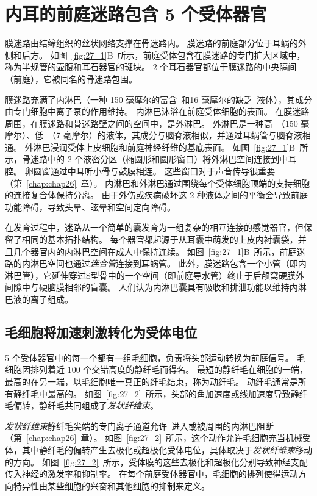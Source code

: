 \section{内耳的前庭迷路包含 5 个受体器官}

膜迷路由结缔组织的丝状网络支撑在骨迷路内。
膜迷路的前庭部分位于耳蜗的外侧和后方。
如图~\ref{fig:27_1}B~所示，前庭受体包含在膜迷路的专门扩大区域中，称为半规管的壶腹和耳石器官的斑块。
2 个耳石器官都位于膜迷路的中央隔间（前庭），它被同名的骨迷路包围。


膜迷路充满了内淋巴（一种 150 毫摩尔的富含~和16 毫摩尔的缺乏~液体），其成分由专门细胞中离子泵的作用维持。
内淋巴沐浴在前庭受体细胞的表面。
在膜迷路周围，在膜迷路和骨迷路壁之间的空间中，是外淋巴。
外淋巴是一种高~（150 毫摩尔）、低~（7 毫摩尔）的液体，其成分与脑脊液相似，并通过耳蜗管与脑脊液相通。
外淋巴浸润受体上皮细胞和前庭神经纤维的基底表面。
如图~\ref{fig:27_1}B~所示，骨迷路中的 2 个液密分区（椭圆形和圆形窗口）将外淋巴空间连接到中耳腔。
卵圆窗通过中耳听小骨与鼓膜相连。
这些窗口对于声音传导很重要（第~\ref{chap:chap26}~章）。
内淋巴和外淋巴通过围绕每个受体细胞顶端的支持细胞的连接复合体保持分离。
由于外伤或疾病破坏这 2 种液体之间的平衡会导致前庭功能障碍，导致头晕、眩晕和空间定向障碍。


在发育过程中，迷路从一个简单的囊发育为一组复杂的相互连接的感觉器官，但保留了相同的基本拓扑结构。
每个器官都起源于从耳囊中萌发的上皮内衬囊袋，并且几个器官内的内淋巴空间在成人中保持连续。
如图~\ref{fig:27_1}B~所示，前庭迷路的内淋巴空间也通过\textit{连合管}连接到耳蜗管。
此外，膜迷路包含一个小管（即内淋巴管），它延伸穿过S型骨中的一个空间（即前庭导水管）终止于后颅窝硬膜外间隙中与硬脑膜相邻的盲囊。
人们认为内淋巴囊具有吸收和排泄功能以维持内淋巴液的离子组成。


\subsection{毛细胞将加速刺激转化为受体电位}

5 个受体器官中的每一个都有一组毛细胞，负责将头部运动转换为前庭信号。
毛细胞因排列着近 100 个交错高度的静纤毛而得名。
最短的静纤毛在细胞的一端，最高的在另一端，以毛细胞唯一真正的纤毛结束，称为动纤毛。
动纤毛通常是所有静纤毛中最高的。
如图~\ref{fig:27_2}~所示，头部的角加速度或线加速度导致静纤毛偏转，静纤毛共同组成了\textit{发状纤维束}。


\textit{发状纤维束}静纤毛尖端的专门离子通道允许~进入或被周围的内淋巴阻断（第~\ref{chap:chap26}~章）。
如图~\ref{fig:27_2}~所示，这个动作允许毛细胞充当机械受体，其中静纤毛的偏转产生去极化或超极化受体电位，具体取决于\textit{发状纤维束}移动的方向。
如图~\ref{fig:27_2}~所示，受体膜的这些去极化和超极化分别导致神经支配传入神经的激发率和抑制率。
在每个前庭受体器官中，毛细胞的排列使得运动方向特异性由某些细胞的兴奋和其他细胞的抑制来定义。

